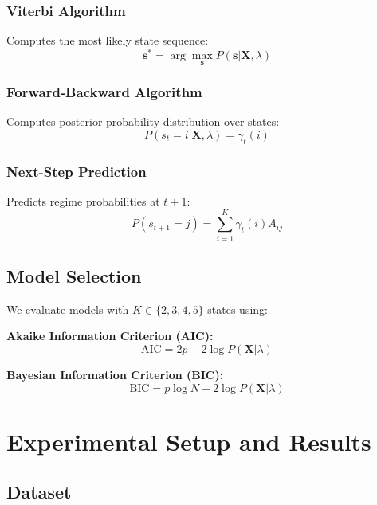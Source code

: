 \documentclass[conference]{IEEEtran}
\begin{document}
\subsubsection{Viterbi Algorithm}
Computes the most likely state sequence:
\begin{equation}
\mathbf{s}^* = \arg\max_{\mathbf{s}} P(\mathbf{s} | \mathbf{X}, \lambda)
\end{equation}

\subsubsection{Forward-Backward Algorithm}
Computes posterior probability distribution over states:
\begin{equation}
P(s_t=i | \mathbf{X}, \lambda) = \gamma_t(i)
\end{equation}

\subsubsection{Next-Step Prediction}
Predicts regime probabilities at $t+1$:
\begin{equation}
P(s_{t+1}=j) = \sum_{i=1}^{K}\gamma_t(i)A_{ij}
\end{equation}

\subsection{Model Selection}

We evaluate models with $K \in \{2, 3, 4, 5\}$ states using:

\textbf{Akaike Information Criterion (AIC):}
\begin{equation}
\text{AIC} = 2p - 2\log P(\mathbf{X}|\lambda)
\end{equation}

\textbf{Bayesian Information Criterion (BIC):}
\begin{equation}
\text{BIC} = p\log N - 2\log P(\mathbf{X}|\lambda)
\end{equation}

\section{Experimental Setup and Results}

\subsection{Dataset}
\end{document}

